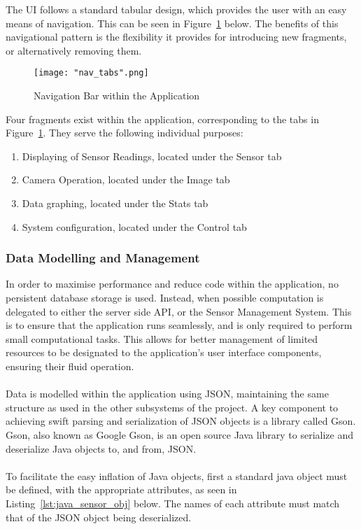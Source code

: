 \documentclass{article}
\begin{document}
\noindent
The UI follows a standard tabular design, which provides the user with an easy means of navigation. This can be seen in Figure~\ref{fig:android_navigation} below. The benefits of this navigational pattern is the flexibility it provides for introducing new fragments, or alternatively removing them.

\begin{figure}[H]
\centering
\texttt{[image: "nav\_tabs".png]}
\caption{Navigation Bar within the Application}
\label{fig:android_navigation}
\end{figure}

\noindent
Four fragments exist within the application, corresponding to the tabs in Figure~\ref{fig:android_navigation}. They serve the following individual purposes:
\begin{enumerate}
  \item Displaying of Sensor Readings, located under the Sensor tab
  \item Camera Operation, located under the Image tab
  \item Data graphing, located under the Stats tab
  \item System configuration, located under the Control tab
\end{enumerate}	

\subsubsection{Data Modelling and Management}
In order to maximise performance and reduce code within the application, no persistent database storage is used. Instead, when possible computation is delegated to either the server side API, or the Sensor Management System. This is to ensure that the application runs seamlessly, and is only required to perform small computational tasks. This allows for better management of limited resources to be designated to the application\rq s user interface components, ensuring their fluid operation. \\\\
Data is modelled within the application using JSON, maintaining the same structure as used in the other subsystems of the project. A key component to achieving swift parsing and serialization of JSON objects is a library called Gson. Gson, also known as Google Gson, is an open source Java library to serialize and deserialize Java objects to, and from, JSON. \\\\
To facilitate the easy inflation of Java objects, first a standard java object must be defined, with the appropriate attributes, as seen in Listing~\ref{lst:java_sensor_obj} below. The names of each attribute must match that of the JSON object being deserialized. 
\end{document}
